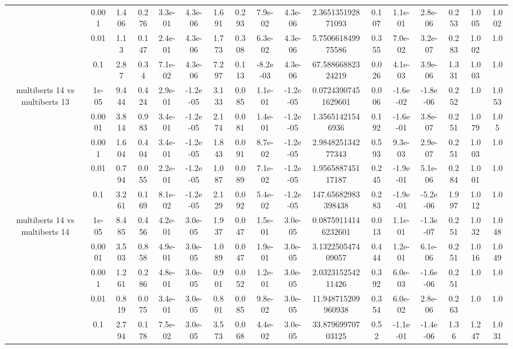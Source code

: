 \begin{tabular}{|c|c|c|c|c|c|c|c|c|c|c|c|c|c|c|c|c|}
 & 0.001 & 1.406 & 0.276 & 3.3e-01 & 4.3e-06 & 1.691 & 0.293 & 7.9e-02 & 4.3e-06 & 2.365135192871093 & 0.107 & 1.1e-01 & 2.8e-06 & 0.253 & 1.005 & 1.002 \\
 & 0.01 & 1.13 & 0.147 & 2.4e-01 & 4.3e-06 & 1.773 & 0.308 & 6.3e-02 & 4.3e-06 & 5.750661849975586 & 0.355 & 7.0e-02 & 3.2e-07 & 0.283 & 1.002 & 1.0 \\
 & 0.1 & 2.87 & 0.34 & 7.1e-02 & 4.3e-06 & 7.297 & 0.113 & -8.2e-03 & 4.3e-06 & 67.58866882324219 & 0.026 & 4.1e-03 & 3.9e-06 & 1.331 & 1.003 & 1.0 \\
\hline
\multirow{5}{*}{multiberts 14 vs multiberts 13} & 1e-05 & 9.444 & 0.424 & 2.9e-01 & -1.2e-05 & 3.133 & 0.085 & 1.1e-01 & -1.2e-05 & 0.07243907451629601 & 0.006 & -1.6e-02 & -1.8e-06 & 0.252 & 1.0 & 1.053 \\
 & 0.0001 & 3.814 & 0.983 & 3.4e-01 & -1.2e-05 & 2.174 & 0.081 & 1.4e-01 & -1.2e-05 & 1.35651421546936 & 0.192 & -1.6e-01 & 3.8e-07 & 0.251 & 1.079 & 1.05 \\
 & 0.001 & 1.604 & 0.404 & 3.4e-01 & -1.2e-05 & 1.843 & 0.091 & 8.7e-02 & -1.2e-05 & 2.984825134277343 & 0.593 & 9.3e-03 & 2.9e-07 & 0.251 & 1.003 & 1.0 \\
 & 0.01 & 0.794 & 0.055 & 2.2e-01 & -1.2e-05 & 1.087 & 0.089 & 7.1e-02 & -1.2e-05 & 1.956588745117187 & 0.245 & -1.9e-01 & 5.1e-06 & 0.284 & 1.001 & 1.0 \\
 & 0.1 & 3.261 & 0.169 & 8.1e-02 & -1.2e-05 & 2.129 & 0.092 & 5.4e-02 & -1.2e-05 & 147.65682983398438 & 0.283 & -1.9e-01 & -5.2e-06 & 1.997 & 1.012 & 1.0 \\
\hline
\multirow{5}{*}{multiberts 14 vs multiberts 14} & 1e-05 & 8.485 & 0.456 & 4.2e-01 & 3.0e-05 & 1.937 & 0.047 & 1.5e-01 & 3.0e-05 & 0.08759114146232601 & 0.013 & 1.1e-01 & -1.3e-07 & 0.251 & 1.032 & 1.048 \\
 & 0.0001 & 3.503 & 0.858 & 4.9e-01 & 3.0e-05 & 1.089 & 0.047 & 1.9e-01 & 3.0e-05 & 3.132250547409057 & 0.444 & 1.2e-01 & 6.1e-06 & 0.251 & 1.016 & 1.049 \\
 & 0.001 & 1.261 & 0.286 & 4.8e-01 & 3.0e-05 & 0.901 & 0.052 & 1.2e-01 & 3.0e-05 & 2.032315254211426 & 0.392 & 6.0e-03 & -1.6e-06 & 0.251 & 1.0 & 1.0 \\
 & 0.01 & 0.819 & 0.075 & 3.4e-01 & 3.0e-05 & 0.801 & 0.085 & 9.8e-02 & 3.0e-05 & 11.948715209960938 & 0.354 & 6.0e-02 & 2.8e-06 & 0.263 & 1.0 & 1.0 \\
 & 0.1 & 2.794 & 0.178 & 7.5e-02 & 3.0e-05 & 3.573 & 0.068 & 4.4e-02 & 3.0e-05 & 33.87969970703125 & 0.52 & -1.1e-01 & -1.4e-06 & 1.36 & 1.247 & 1.031 \\

\end{tabular}
